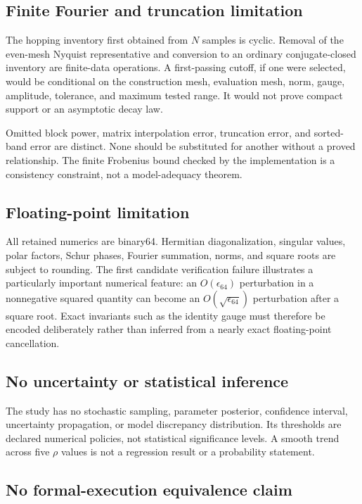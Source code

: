 \subsection{Finite Fourier and truncation limitation}

The hopping inventory first obtained from $N$ samples is cyclic.  Removal of the even-mesh
Nyquist representative and conversion to an ordinary conjugate-closed inventory are
finite-data operations.  A first-passing cutoff, if one were selected, would be
conditional on the construction mesh, evaluation mesh, norm, gauge, amplitude, tolerance,
and maximum tested range.  It would not prove compact support or an asymptotic decay law.

Omitted block power, matrix interpolation error, truncation error, and sorted-band error
are distinct.  None should be substituted for another without a proved relationship.
The finite Frobenius bound checked by the implementation is a consistency constraint,
not a model-adequacy theorem.

\subsection{Floating-point limitation}

All retained numerics are binary64.  Hermitian diagonalization, singular values, polar
factors, Schur phases, Fourier summation, norms, and square roots are subject to rounding.
The first candidate verification failure illustrates a particularly important numerical
feature: an $O(\epsilon_{64})$ perturbation in a nonnegative squared quantity can become
an $O(\sqrt{\epsilon_{64}})$ perturbation after a square root.  Exact invariants such as
the identity gauge must therefore be encoded deliberately rather than inferred from a
nearly exact floating-point cancellation.

\subsection{No uncertainty or statistical inference}

The study has no stochastic sampling, parameter posterior, confidence interval,
uncertainty propagation, or model discrepancy distribution.  Its thresholds are declared
numerical policies, not statistical significance levels.  A smooth trend across five
$\rho$ values is not a regression result or a probability statement.

\subsection{No formal-execution equivalence claim}

